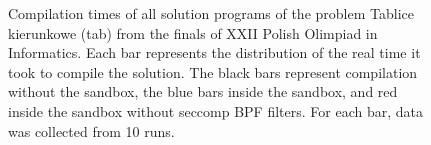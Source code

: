 \documentclass[en]{pracamgr}
\begin{document}
\begin{appendices}
\begin{figure}[H]
\caption{Compilation times of all solution programs of the problem Tablice kierunkowe (tab) from the finals of XXII Polish Olimpiad in Informatics. Each bar represents the distribution of the real time it took to compile the solution. The black bars represent compilation without the sandbox, the blue bars inside the sandbox, and red inside the sandbox without seccomp BPF filters. For each bar, data was collected from 10 runs.}
\label{figure:tab_compilation_real_time}
\end{figure}


\end{appendices}
\end{document}
